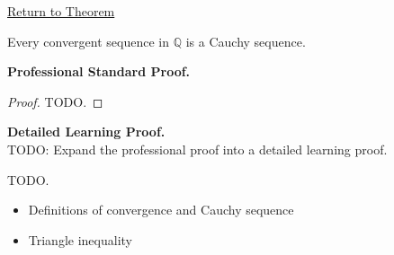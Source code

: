 \newpage
{}
\label{prf:convergent-implies-cauchy-q}

\begin{remark*}[Return]
\hyperref[thm:convergent-implies-cauchy-q]{Return to Theorem}
\end{remark*}

\begin{theorem*}
Every convergent sequence in $\mathbb{Q}$ is a Cauchy sequence.
\end{theorem*}

\textbf{Professional Standard Proof.}~\\
\begin{proof}
TODO.
\end{proof}

\textbf{Detailed Learning Proof.}~\\
TODO: Expand the professional proof into a detailed learning proof.


\begin{remark*}
TODO.
\end{remark*}

\begin{dependencies}
\begin{itemize}
  \item Definitions of convergence and Cauchy sequence
  \item Triangle inequality
\end{itemize}
\end{dependencies}

